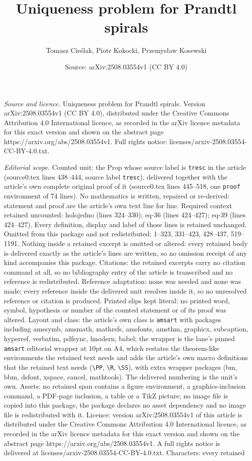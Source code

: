 \documentclass[10pt,a4paper]{amsart}
\title[Uniqueness problem for Prandtl spirals]{Uniqueness problem for Prandtl spirals}
\author{Tomasz Cie\'slak, Piotr Kokocki, Przemys{\l}aw Kosewski}
\date{Source: arXiv:2508.03554v1 (CC BY 4.0)}
\begin{document}
\maketitle

\noindent\emph{Source and licence.} Uniqueness problem for Prandtl spirals. Version arXiv:2508.03554v1 (CC BY 4.0), distributed under the Creative Commons Attribution 4.0 International licence, as recorded in the arXiv licence metadata for this exact version and shown on the abstract page https://arxiv.org/abs/2508.03554v1. Full rights notice: licenses/arxiv-2508.03554-CC-BY-4.0.txt.\par\smallskip

\noindent\textit{Editorial scope.} Counted unit: the Prop whose source label is \texttt{tresc} in the article (source0.tex lines 438--444, source label \texttt{tresc}), delivered together with the article's own complete original proof of it (source0.tex lines 445--518, one \texttt{proof} environment of 74 lines). No mathematics is written, repaired or re-derived: statement and proof are the article's own text line for line. Required context retained uncounted: holojedno (lines 324--330); eq-36 (lines 424--427); eq-39 (lines 424--427). Every definition, display and label of those lines is retained unchanged. Omitted from this package and not redistributed: 1--323, 331--423, 428--437, 519--1191. Nothing inside a retained excerpt is omitted or altered: every retained body is delivered exactly as the article's lines are written, so no omission receipt of any kind accompanies this package. Citations: the retained excerpts carry no citation command at all, so no bibliography entry of the article is transcribed and no reference is redistributed. Reference adaptation: none was needed and none was made; every reference inside the delivered unit resolves inside it, so no unresolved reference or citation is produced. Printed slips kept literal: no printed word, symbol, hypothesis or number of the counted statement or of its proof was altered. Layout and class: the article's own class is \texttt{amsart} with packages including amssymb, amsmath, mathrsfs, amsfonts, amsthm, graphicx, subcaption, hyperref, verbatim, pdfsync, lmodern, babel; the wrapper is the lane's pinned \texttt{amsart} editorial wrapper at 10pt on A4, which restates the theorem-like environments the retained text needs and adds the article's own macro definitions that the retained text needs (\texttt{\textbackslash PP}, \texttt{\textbackslash R}, \texttt{\textbackslash SS}), with extra wrapper packages (bm, bbm, dsfont, xspace, cancel, mathtools). The delivered numbering is the unit's own. Assets: no retained span contains a figure environment, a graphics-inclusion command, a PDF-page inclusion, a table or a TikZ picture; no image file is copied into this package, the package declares no asset dependency and no image file is redistributed with it. Licence: version arXiv:2508.03554v1 of this article is distributed under the Creative Commons Attribution 4.0 International licence, as recorded in the arXiv licence metadata for this exact version and shown on the abstract page https://arxiv.org/abs/2508.03554v1. A full rights notice is delivered at licenses/arxiv-2508.03554-CC-BY-4.0.txt. Characters: every retained 
\end{document}
